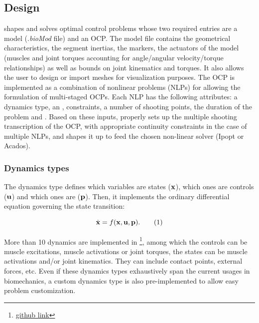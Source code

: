 \subsection{Design}
\bioptim shapes and solves optimal control problems whose two required entries are a model (.\textit{bioMod} file) and an OCP.
The model file contains the geometrical characteristics, the segment inertias, the markers, the actuators of the model (muscles and joint torques accounting for angle/angular velocity/torque relationships) as well as bounds on joint kinematics and torques. 
It also allows the user to design or import meshes for visualization purposes.
The OCP is implemented as a combination of nonlinear problems (NLPs) for allowing the formulation of multi-staged OCPs. 
Each NLP has the following attributes: a dynamics type, an , constraints, a number of shooting points, the duration of the problem and .
Based on these inputs, \bioptim properly sets up the multiple shooting transcription of the OCP, with appropriate continuity constraints in the case of multiple NLPs, and shapes it up to feed the chosen non-linear solver (Ipopt or Acados). 

\subsubsection{Dynamics types}
The dynamics type defines which variables are states ($\mathbf{x}$), which ones are controls ($\mathbf{u}$) and which ones are  ($\mathbf{p}$).
Then, it implements the ordinary differential equation governing the state transition:

\[
\dstate = f(\state, \control, \param).
\addtag
\label{eq:state_transition}
\]

\noindent More than 10 dynamics are implemented in \bioptim \footnote{\href{https://github.com/pyomeca/bioptim/blob/master/bioptim/dynamics/dynamics_functions.py}{github link}}, among which the controls can be muscle excitations, muscle activations or joint torques, the states can be muscle activations and/or joint kinematics.
They can include contact points, external forces, etc.
Even if these dynamics types exhaustively span the current usages in biomechanics, a custom dynamics type is also pre-implemented to allow easy problem customization.

